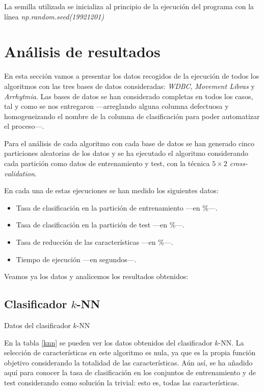 \documentclass[a4paper, 11pt, titlepage]{article}
\begin{document}
    La semilla utilizada se inicializa al principio de la ejecución del programa con la línea \emph{np.random.seed(19921201)}


    \section{Análisis de resultados}

    En esta sección vamos a presentar los datos recogidos de la ejecución de todos los algoritmos con las tres bases de datos consideradas: \emph{WDBC}, \emph{Movement Libras} y \emph{Arrhytmia}. Las bases de datos se han considerado completas en todos los casos, tal y como se nos entregaron ---arreglando alguna columna defectuosa y homogeneizando el nombre de la columna de clasificación para poder automatizar el proceso---.

    Para el análisis de cada algoritmo con cada base de datos se han generado cinco particiones aleatorias de los datos y se ha ejecutado el algoritmo considerando cada partición como datos de entrenamiento y test, con la técnica \emph{$5\times2$ cross-validation}.

    En cada una de estas ejecuciones se han medido los siguientes datos:
    \begin{itemize}
        \item Tasa de clasificación en la partición de entrenamiento ---en \%---.
        \item Tasa de clasificación en la partición de test ---en \%---.
        \item Tasa de reducción de las características ---en \%---.
        \item Tiempo de ejecución ---en segundos---.
    \end{itemize}

    Veamos ya los datos y analicemos los resultados obtenidos:

    \subsection{Clasificador $k$-NN}
    \begin{table}[!htb]
        \maketable{\dataKNN}
        \caption{Datos del clasificador $k$-NN}
        \label{knn}
    \end{table}

    En la tabla \ref{knn} se pueden ver los datos obtenidos del clasificador $k$-NN. La selección de características en este algoritmo es nula, ya que es la propia función objetivo considerando la totalidad de las características. Aún así, se ha añadido aquí para conocer la tasa de clasificación en los conjuntos de entrenamiento y de test considerando como solución la trivial: esto es, todas las características.
\end{document}

